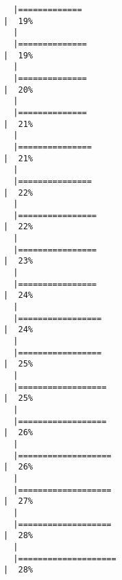 \documentclass[12pt]{article}
\begin{document}
\begin{verbatim}
  |=============                                                         |  19%
  |                                                                            
  |==============                                                        |  19%
  |                                                                            
  |==============                                                        |  20%
  |                                                                            
  |==============                                                        |  21%
  |                                                                            
  |===============                                                       |  21%
  |                                                                            
  |===============                                                       |  22%
  |                                                                            
  |================                                                      |  22%
  |                                                                            
  |================                                                      |  23%
  |                                                                            
  |================                                                      |  24%
  |                                                                            
  |=================                                                     |  24%
  |                                                                            
  |=================                                                     |  25%
  |                                                                            
  |==================                                                    |  25%
  |                                                                            
  |==================                                                    |  26%
  |                                                                            
  |===================                                                   |  26%
  |                                                                            
  |===================                                                   |  27%
  |                                                                            
  |===================                                                   |  28%
  |                                                                            
  |====================                                                  |  28%

\end{verbatim}
\end{document}
